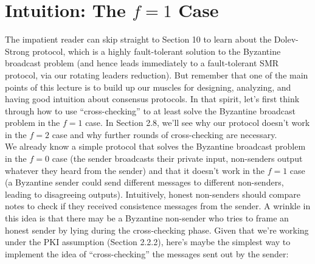 \section{Intuition: The $f = 1$ Case}
The impatient reader can skip straight to Section 10 to learn about the Dolev-Strong protocol, which is a highly fault-tolerant solution to the Byzantine broadcast problem (and hence
leads immediately to a fault-tolerant SMR protocol, via our rotating leaders reduction). But
remember that one of the main points of this lecture is to build up our muscles for designing,
analyzing, and having good intuition about consensus protocols. In that spirit, let’s first
think through how to use “cross-checking” to at least solve the Byzantine broadcast problem in the $f = 1$ case. In Section 2.8, we’ll see why our protocol doesn’t work in the $f = 2$ case and why further rounds of cross-checking are necessary.\\
We already know a simple protocol that solves the Byzantine broadcast problem in the
$f = 0$ case (the sender broadcasts their private input, non-senders output whatever they
heard from the sender) and that it doesn’t work in the $f = 1$ case (a Byzantine sender could
send different messages to different non-senders, leading to disagreeing outputs). Intuitively,
honest non-senders should compare notes to check if they received consistence messages from
the sender. A wrinkle in this idea is that there may be a Byzantine non-sender who tries to
frame an honest sender by lying during the cross-checking phase.
Given that we’re working under the PKI assumption (Section 2.2.2), here’s maybe the simplest way to implement the idea of “cross-checking” the messages sent out by the sender:



